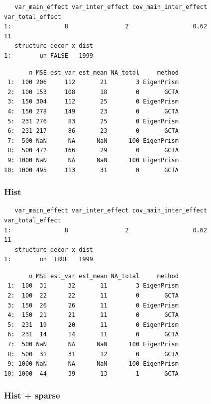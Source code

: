 \documentclass[]{article}
\begin{document}
\begin{verbatim}
   var_main_effect var_inter_effect cov_main_inter_effect var_total_effect
1:               8                2                  0.62               11
   structure decor x_dist
1:        un FALSE   1999
\end{verbatim}

\begin{verbatim}
       n MSE est_var est_mean NA_total     method
 1:  100 206     112       21        3 EigenPrism
 2:  100 153     108       18        0       GCTA
 3:  150 304     112       25        0 EigenPrism
 4:  150 278     149       23        0       GCTA
 5:  231 276      83       25        0 EigenPrism
 6:  231 217      86       23        0       GCTA
 7:  500 NaN      NA      NaN      100 EigenPrism
 8:  500 472     166       29        0       GCTA
 9: 1000 NaN      NA      NaN      100 EigenPrism
10: 1000 495     113       31        0       GCTA
\end{verbatim}

\subsubsection{Hist}\label{hist}

\begin{verbatim}
   var_main_effect var_inter_effect cov_main_inter_effect var_total_effect
1:               8                2                  0.62               11
   structure decor x_dist
1:        un  TRUE   1999
\end{verbatim}

\begin{verbatim}
       n MSE est_var est_mean NA_total     method
 1:  100  31      32       11        3 EigenPrism
 2:  100  22      22       11        0       GCTA
 3:  150  26      26       11        0 EigenPrism
 4:  150  21      21       11        0       GCTA
 5:  231  19      20       11        0 EigenPrism
 6:  231  14      14       11        0       GCTA
 7:  500 NaN      NA      NaN      100 EigenPrism
 8:  500  31      31       12        0       GCTA
 9: 1000 NaN      NA      NaN      100 EigenPrism
10: 1000  44      39       13        1       GCTA
\end{verbatim}

\subsubsection{Hist + sparse}\label{hist-sparse}
\end{document}

